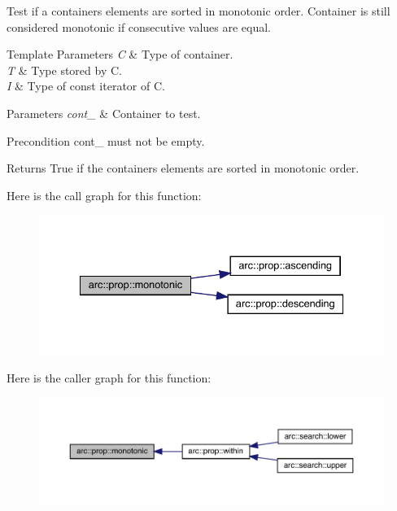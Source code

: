 Test if a container\textquotesingle{}s elements are sorted in monotonic order. Container is still considered monotonic if consecutive values are equal.


\begin{DoxyTemplParams}{Template Parameters}
{\em C} & Type of container. \\
\hline
{\em T} & Type stored by C. \\
\hline
{\em I} & Type of const iterator of C.\\
\hline
\end{DoxyTemplParams}

\begin{DoxyParams}{Parameters}
{\em cont\+\_\+} & Container to test.\\
\hline
\end{DoxyParams}
\begin{DoxyPrecond}{Precondition}
cont\+\_\+ must not be empty.
\end{DoxyPrecond}
\begin{DoxyReturn}{Returns}
True if the container\textquotesingle{}s elements are sorted in monotonic order. 
\end{DoxyReturn}
Here is the call graph for this function\+:\nopagebreak
\begin{figure}[H]
\begin{center}
\leavevmode
\includegraphics[width=335pt]{namespacearc_1_1prop_a0b6cfeae4fa16eddbb6b7f1e9c355258_cgraph}
\end{center}
\end{figure}
Here is the caller graph for this function\+:\nopagebreak
\begin{figure}[H]
\begin{center}
\leavevmode
\includegraphics[width=350pt]{namespacearc_1_1prop_a0b6cfeae4fa16eddbb6b7f1e9c355258_icgraph}
\end{center}
\end{figure}
\mbox{\label{namespacearc_1_1prop_aa5ffd8e519bbfe13d8b6c9b9ebf81855}} 
